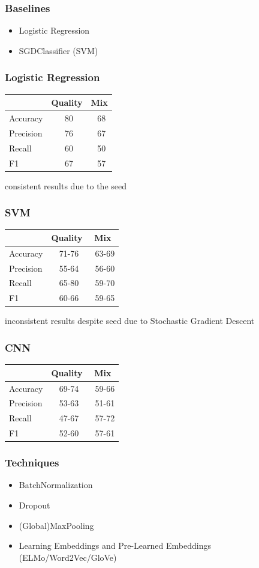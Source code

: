 \documentclass{beamer}
\begin{document}
\begin{frame}
    \frametitle{Baselines}
    \begin{itemize}
        \item Logistic Regression
        \item SGDClassifier (SVM)
    \end{itemize}
\end{frame}

\begin{frame}
    \frametitle{Logistic Regression}
    \begin{tabular}{l|c|c}
                  & Quality & Mix \\\hline
        Accuracy  & ~80 & ~68 \\
        Precision & ~76 & ~67 \\
        Recall    & ~60 & ~50 \\
        F1        & ~67 & ~57
    \end{tabular}
    consistent results due to the seed
\end{frame}

\begin{frame}
    \frametitle{SVM}
    \begin{tabular}{l|c|c}
                  & Quality & Mix \\\hline
        Accuracy  & ~71-76 & ~63-69\\
        Precision & ~55-64 & ~56-60\\
        Recall    & ~65-80 & ~59-70\\
        F1        & ~60-66 & ~59-65
    \end{tabular}
    inconsistent results despite seed due to Stochastic Gradient Descent
\end{frame}

\begin{frame}
    \frametitle{CNN}
    \begin{tabular}{l|c|c}
                  & Quality & Mix \\\hline
        Accuracy  & ~69-74 & ~59-66 \\
        Precision & ~53-63 & ~51-61 \\
        Recall    & ~47-67 & ~57-72 \\
        F1        & ~52-60 & ~57-61
    \end{tabular}
\end{frame}

\begin{frame}
    \frametitle{Techniques}
    \begin{itemize}
        \item BatchNormalization
        \item Dropout
        \item (Global)MaxPooling
        \item Learning Embeddings and Pre-Learned Embeddings (ELMo/Word2Vec/GloVe)
    \end{itemize}
\end{frame}
\end{document}
